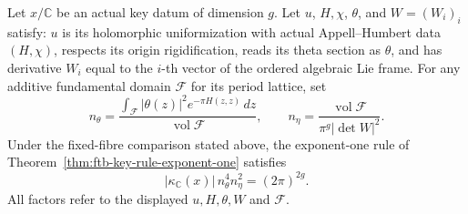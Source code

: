 \begin{srproposition}
\label{prop:ftb-key-exact-archnorm}
Let \(x/\mathbb C\) be an actual key datum of dimension \(g\).
Let \(u\), \(H,\chi\), \(\theta\), and \(W=(W_i)_i\) satisfy:
\(u\) is its holomorphic uniformization with actual
Appell--Humbert data \((H,\chi)\), respects its origin
rigidification, reads its theta section as \(\theta\), and
has derivative \(W_i\) equal to the \(i\)-th vector of the
ordered algebraic Lie frame.
For any additive fundamental domain \(\mathcal F\) for its
period lattice, set
\[
 n_\theta=
 \frac{\displaystyle\int_{\mathcal F}|\theta(z)|^2
                           e^{-\pi H(z,z)}\,dz}
      {\operatorname{vol}\mathcal F},
 \qquad
 n_\eta=
 \frac{\operatorname{vol}\mathcal F}
      {\pi^g|\det W|^2}.
\]
Under the fixed-fibre comparison stated above, the
exponent-one rule of
Theorem~\ref{thm:ftb-key-rule-exponent-one} satisfies
\[
                       |\kappa_{\mathbb C}(x)|\,
                                  n_\theta^4n_\eta^2=(2\pi)^{2g}.
 \tag{A2}\label{eq:ftb-key-archnorm}
\]
All factors refer to the displayed \(u,H,\theta,W\) and
\(\mathcal F\).
\end{srproposition}
